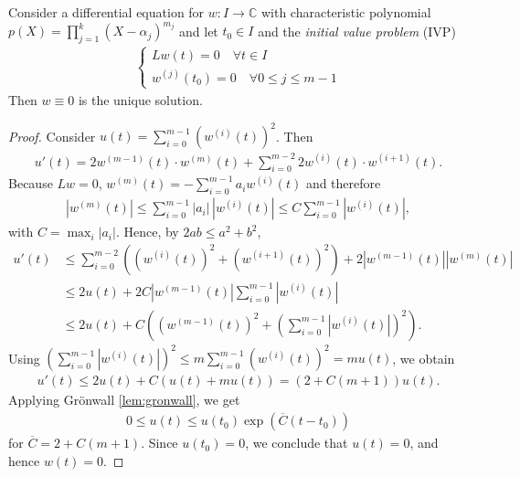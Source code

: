 \begin{lemma}\label{lem:zero-in-out}
    Consider a differential equation for $w: I \to \mathbb{C}$ with characteristic polynomial $p(X) = \prod_{j=1}^{k}(X-\alpha_{j})^{m_{j}}$ and let $t_{0} \in I$ and the \textit{initial value problem} (IVP)
    \begin{align*}
        \begin{cases}
            Lw(t) = 0 \quad \forall t \in I \\ 
            w^{(j)}(t_{0}) = 0 \quad \forall 0 \leq j \leq m-1
        \end{cases}
    \end{align*}
    Then $w \equiv  0$ is the unique solution.
\end{lemma}
\begin{proof}
    Consider $u(t) = \sum_{i=0}^{m-1} (w^{(i)}(t))^{2}$. Then
\begin{align*}
    u'(t) = 2w^{(m-1)}(t) \cdot w^{(m)}(t) + \sum_{i=0}^{m-2} 2 w^{(i)}(t) \cdot w^{(i+1)}(t).
\end{align*}
Because $Lw = 0$, $ w^{(m)}(t) = - \sum_{i=0}^{m-1} a_{i}w^{(i)}(t)$ and therefore
\begin{align*}
    \left| w^{(m)}(t) \right|
    \leq \sum_{i=0}^{m-1} |a_i|\, |w^{(i)}(t)|
    \leq C \sum_{i=0}^{m-1} \left| w^{(i)}(t) \right|,
\end{align*}
with $C = \max_{i} |a_i|$. Hence, by $2ab \leq a^{2}+b^{2}$,
\begin{align*}
    u'(t)
    &\leq \sum_{i=0}^{m-2} \left( (w^{(i)}(t))^{2} + (w^{(i+1)}(t))^{2} \right)
        + 2 \left| w^{(m-1)}(t) \right| \left| w^{(m)}(t) \right| \\
    &\leq 2u(t)
        + 2C \left| w^{(m-1)}(t) \right|
        \sum_{i=0}^{m-1} \left| w^{(i)}(t) \right| \\
    &\leq 2u(t)
        + C \left( (w^{(m-1)}(t))^{2}
        + \left( \sum_{i=0}^{m-1} |w^{(i)}(t)| \right)^{2} \right).
\end{align*}
Using $\left( \sum_{i=0}^{m-1} |w^{(i)}(t)| \right)^{2} \leq m \sum_{i=0}^{m-1} (w^{(i)}(t))^{2} = mu(t)$, we obtain
\begin{align*}
    u'(t)
    \leq 2u(t) + C(u(t) + mu(t))
    = (2 + C(m+1))u(t).
\end{align*}
Applying Grönwall \ref{lem:gronwall}, we get
\begin{align*}
    0 \leq u(t)
    \leq u(t_{0}) \exp(\overline{C}(t-t_{0}))
\end{align*}
for $\overline{C} = 2 + C(m+1)$. Since $u(t_{0}) = 0$, we conclude that $u(t)=0$, and hence $w(t)=0$.
\end{proof}

